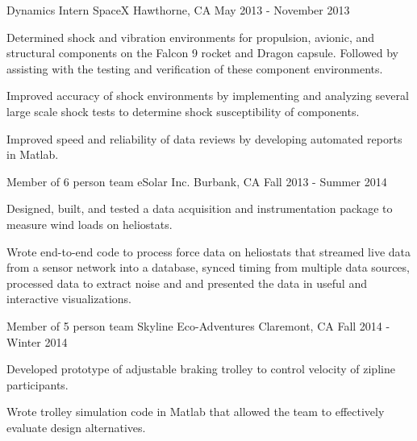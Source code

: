 \begin{cventries}
  \cventry
    {Dynamics Intern} %
    {SpaceX} %
    {Hawthorne, CA} %
    {May 2013 - November 2013} %
    {
      \begin{cvitems} %
        \item {Determined shock and vibration environments for propulsion, avionic, and structural components on the Falcon 9 rocket and Dragon capsule. Followed by assisting with the testing and verification of these component environments.}
        \item {Improved accuracy of shock environments by implementing and analyzing several large scale shock tests to determine shock susceptibility of components.}
        \item {Improved speed and reliability of data reviews by developing automated reports in Matlab.}
      \end{cvitems} 
    }

  \cventry
    {Member of 6 person team} %
    {eSolar Inc.} %
    {Burbank, CA} %
    {Fall 2013 - Summer 2014} %
    {
      \begin{cvitems} %
        \item {Designed, built, and tested a data acquisition and instrumentation package to measure wind loads on heliostats.}
        \item {Wrote end-to-end code to process force data on heliostats that streamed live data from a sensor network into a database, synced timing from multiple data sources, processed data to extract noise and and presented the data in useful and interactive visualizations.}
      \end{cvitems}
    }

  \cventry
    {Member of 5 person team} %
    {Skyline Eco-Adventures} %
    {Claremont, CA} %
    {Fall 2014 - Winter 2014} %
    {
      \begin{cvitems} %
        \item {Developed prototype of adjustable braking trolley to control velocity of zipline participants.}
        \item {Wrote trolley simulation code in Matlab that allowed the team to effectively evaluate design alternatives.}
      \end{cvitems}
    }


\end{cventries}
